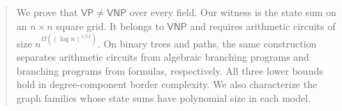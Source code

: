 \documentclass[11pt]{article}
\begin{document}
\maketitle

\begin{abstract}
We prove that \(\mathsf{VP}\ne\mathsf{VNP}\) over every field. Our
witness is the state sum on an \(n\times n\) square grid. It belongs
to \(\mathsf{VNP}\) and requires arithmetic circuits of size
\(n^{\Omega((\log n)^{1/12})}\). On binary trees and paths, the same
construction separates arithmetic circuits from algebraic branching
programs and branching programs from formulas, respectively. All
three lower bounds hold in degree-component border complexity. We
also characterize the graph families whose state sums have polynomial
size in each model.
\end{abstract}











\end{document}
